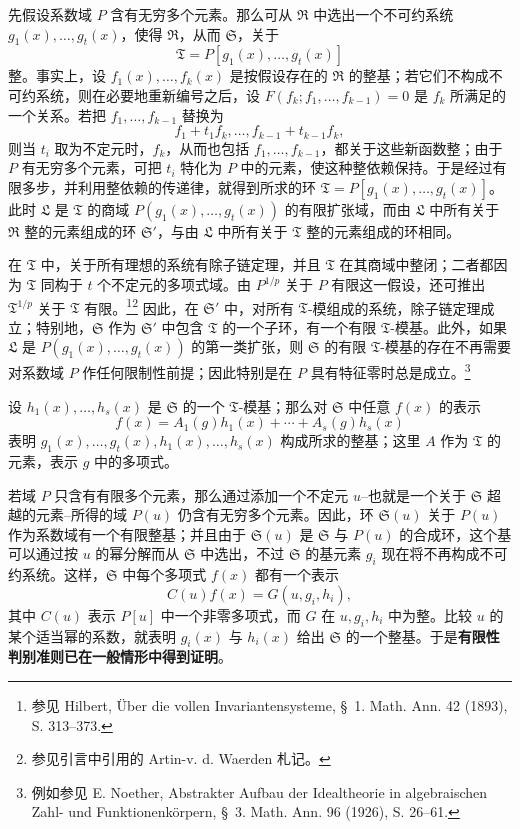 先假设系数域 $P$ 含有无穷多个元素。那么可从 $\mathfrak R$ 中选出一个不可约系统 $g_1(x),\ldots,g_t(x)$，使得 $\mathfrak R$，从而 $\mathfrak S$，关于
\[
 \mathfrak T=P[g_1(x),\ldots,g_t(x)]
\]
整。事实上，设 $f_1(x),\ldots,f_k(x)$ 是按假设存在的 $\mathfrak R$ 的整基；若它们不构成不可约系统，则在必要地重新编号之后，设 $F(f_k;f_1,\ldots,f_{k-1})=0$ 是 $f_k$ 所满足的一个关系。若把 $f_1,\ldots,f_{k-1}$ 替换为
\[
 f_1+t_1f_k,\ldots,f_{k-1}+t_{k-1}f_k,
\]
则当 $t_i$ 取为不定元时，$f_k$，从而也包括 $f_1,\ldots,f_{k-1}$，都关于这些新函数整；由于 $P$ 有无穷多个元素，可把 $t_i$ 特化为 $P$ 中的元素，使这种整依赖保持。于是经过有限多步，并利用整依赖的传递律，就得到所求的环 $\mathfrak T=P[g_1(x),\ldots,g_t(x)]$。此时 $\mathfrak L$ 是 $\mathfrak T$ 的商域 $P(g_1(x),\ldots,g_t(x))$ 的有限扩张域，而由 $\mathfrak L$ 中所有关于 $\mathfrak R$ 整的元素组成的环 $\mathfrak S'$，与由 $\mathfrak L$ 中所有关于 $\mathfrak T$ 整的元素组成的环相同。

在 $\mathfrak T$ 中，关于所有理想的系统有除子链定理，并且 $\mathfrak T$ 在其商域中整闭；二者都因为 $\mathfrak T$ 同构于 $t$ 个不定元的多项式域。由 $P^{1/p}$ 关于 $P$ 有限这一假设，还可推出 $\mathfrak T^{1/p}$ 关于 $\mathfrak T$ 有限。\footnote{参见 Hilbert, Über die vollen Invariantensysteme, \S\ 1. Math. Ann. 42 (1893), S. 313--373.}\footnote{参见引言中引用的 Artin-v. d. Waerden 札记。} 因此，在 $\mathfrak S'$ 中，对所有 $\mathfrak T$-模组成的系统，除子链定理成立；特别地，$\mathfrak S$ 作为 $\mathfrak S'$ 中包含 $\mathfrak T$ 的一个子环，有一个有限 $\mathfrak T$-模基。此外，如果 $\mathfrak L$ 是 $P(g_1(x),\ldots,g_t(x))$ 的第一类扩张，则 $\mathfrak S$ 的有限 $\mathfrak T$-模基的存在不再需要对系数域 $P$ 作任何限制性前提；因此特别是在 $P$ 具有特征零时总是成立。\footnote{例如参见 E. Noether, Abstrakter Aufbau der Idealtheorie in algebraischen Zahl- und Funktionenkörpern, \S\ 3. Math. Ann. 96 (1926), S. 26--61.}

设 $h_1(x),\ldots,h_s(x)$ 是 $\mathfrak S$ 的一个 $\mathfrak T$-模基；那么对 $\mathfrak S$ 中任意 $f(x)$ 的表示
\[
 f(x)=A_1(g)h_1(x)+\cdots+A_s(g)h_s(x)
\]
表明 $g_1(x),\ldots,g_t(x),h_1(x),\ldots,h_s(x)$ 构成所求的整基；这里 $A$ 作为 $\mathfrak T$ 的元素，表示 $g$ 中的多项式。

若域 $P$ 只含有有限多个元素，那么通过添加一个不定元 $u$--也就是一个关于 $\mathfrak S$ 超越的元素--所得的域 $P(u)$ 仍含有无穷多个元素。因此，环 $\mathfrak S(u)$ 关于 $P(u)$ 作为系数域有一个有限整基；并且由于 $\mathfrak S(u)$ 是 $\mathfrak S$ 与 $P(u)$ 的合成环，这个基可以通过按 $u$ 的幂分解而从 $\mathfrak S$ 中选出，不过 $\mathfrak S$ 的基元素 $g_i$ 现在将不再构成不可约系统。这样，$\mathfrak S$ 中每个多项式 $f(x)$ 都有一个表示
\[
 C(u)f(x)=G(u,g_i,h_i),
\]
其中 $C(u)$ 表示 $P[u]$ 中一个非零多项式，而 $G$ 在 $u,g_i,h_i$ 中为整。比较 $u$ 的某个适当幂的系数，就表明 $g_i(x)$ 与 $h_i(x)$ 给出 $\mathfrak S$ 的一个整基。于是\textbf{有限性判别准则已在一般情形中得到证明}。

